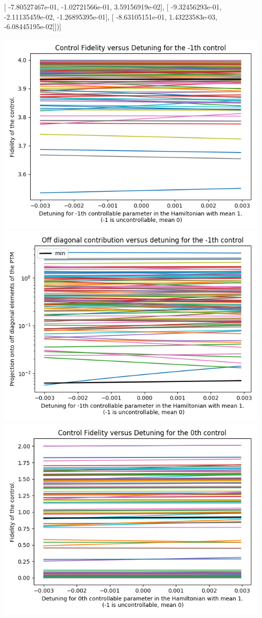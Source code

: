 \documentclass{article}
\begin{document}
       [ -7.80527467e-01,  -1.02721566e-01,   3.59156919e-02],
       [ -9.32456293e-01,  -2.11135459e-02,  -1.26895395e-01],
       [ -8.63105151e-01,   1.43223583e-03,  -6.08445195e-02]])]
\begin{center}
\includegraphics[scale=.9]{control_fid_0}
\includegraphics[scale=.9]{off_diag_0}
\includegraphics[scale=.9]{control_fid_1}

\end{center}
\end{document}
